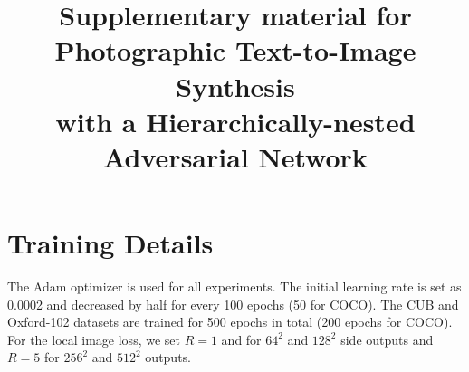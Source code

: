 \documentclass[10pt, letterpaper]{article}
\begin{document}

\title{Supplementary material for Photographic Text-to-Image Synthesis \\ with a Hierarchically-nested Adversarial Network}

\maketitle




\section{Training Details}
The Adam optimizer is used for all experiments.  The initial learning rate is set as 0.0002 and decreased by half for every 100 epochs (50 for COCO). The CUB and Oxford-102 datasets are trained for 500 epochs in total (200 epochs for COCO).
For the local image loss, we set $R=1$ and for $64^2$ and $128^2$ side outputs and $R=5$ for $256^2$ and $512^2$ outputs. 
\end{document}
